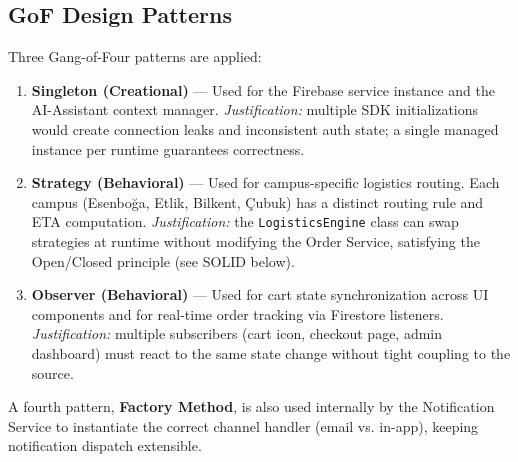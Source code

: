\documentclass[11pt,a4paper]{article}
\begin{document}
\subsection{GoF Design Patterns}
Three Gang-of-Four patterns are applied:

\begin{enumerate}
    \item \textbf{Singleton (Creational)} --- Used for the Firebase service instance and the AI-Assistant context manager. \textit{Justification:} multiple SDK initializations would create connection leaks and inconsistent auth state; a single managed instance per runtime guarantees correctness.
    \item \textbf{Strategy (Behavioral)} --- Used for campus-specific logistics routing. Each campus (Esenboğa, Etlik, Bilkent, Çubuk) has a distinct routing rule and ETA computation. \textit{Justification:} the \texttt{LogisticsEngine} class can swap strategies at runtime without modifying the Order Service, satisfying the Open/Closed principle (see SOLID below).
    \item \textbf{Observer (Behavioral)} --- Used for cart state synchronization across UI components and for real-time order tracking via Firestore listeners. \textit{Justification:} multiple subscribers (cart icon, checkout page, admin dashboard) must react to the same state change without tight coupling to the source.
\end{enumerate}

A fourth pattern, \textbf{Factory Method}, is also used internally by the Notification Service to instantiate the correct channel handler (email vs. in-app), keeping notification dispatch extensible.
\end{document}

